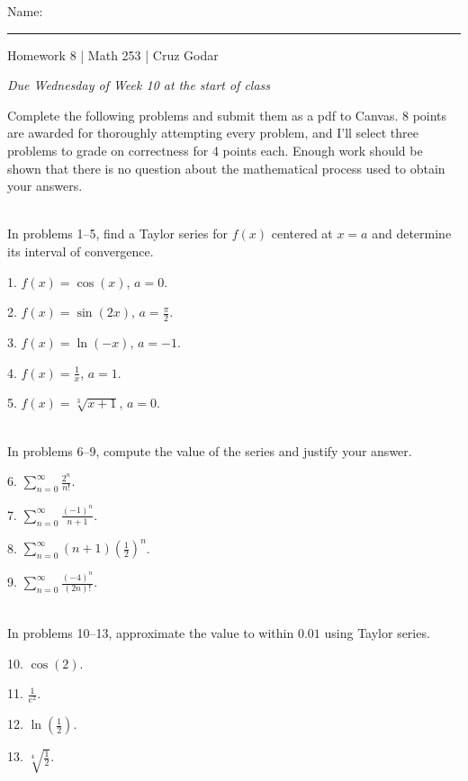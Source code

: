 \documentclass{article}
\begin{document}
\Large Name: \rule{2in}{0.15mm} \hfill Homework 8 | Math 253 | Cruz Godar \vspace{4pt} \normalsize

\textit{Due Wednesday of Week 10 at the start of class}

Complete the following problems and submit them as a pdf to Canvas. 8 points are awarded for thoroughly attempting every problem, and I'll select three problems to grade on correctness for 4 points each. Enough work should be shown that there is no question about the mathematical process used to obtain your answers.

~\\

In problems 1--5, find a Taylor series for $f(x)$ centered at $x = a$ and determine its interval of convergence.

1. $\displaystyle f(x) = \cos(x)$, $\displaystyle a = 0$.

2. $\displaystyle f(x) = \sin(2x)$, $\displaystyle a = \frac{\pi}{2}$.

3. $\displaystyle f(x) = \ln(-x)$, $\displaystyle a = -1$.

4. $\displaystyle f(x) = \frac{1}{x}$, $\displaystyle a = 1$.

5. $\displaystyle f(x) = \sqrt[3]{x + 1}$, $\displaystyle a = 0$.

~\\

In problems 6--9, compute the value of the series and justify your answer.

6. $\displaystyle \sum_{n = 0}^\infty \frac{2^n}{n!}$.

7. $\displaystyle \sum_{n = 0}^\infty \frac{(-1)^n}{n + 1}$.

8. $\displaystyle \sum_{n = 0}^\infty (n + 1)\left( \frac{1}{2} \right)^n$.

9. $\displaystyle \sum_{n = 0}^\infty \frac{(-4)^n}{(2n)!}$.

~\\

In problems 10--13, approximate the value to within $0.01$ using Taylor series. 

10. $\displaystyle \cos(2)$.

11. $\displaystyle \frac{1}{e^2}$.

12. $\displaystyle \ln\left( \frac{1}{2} \right)$.

13. $\displaystyle \sqrt[4]{\frac{1}{2}}$.

~\\
\end{document}
